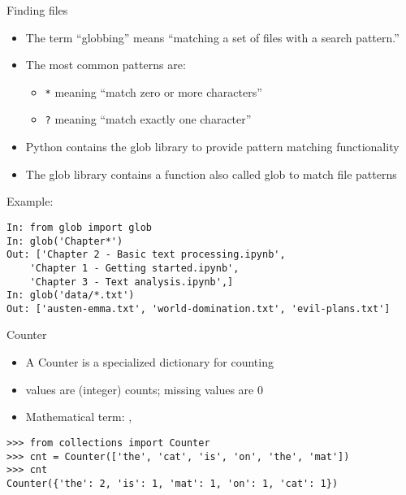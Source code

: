 \documentclass[aspectratio=169,usenames,dvipsnames]{beamer}
\begin{document}
\begin{frame}[fragile]{Finding files}
    \begin{itemize}
        \item The term ``globbing'' means ``matching a set of files with a search pattern.''
        \item The most common patterns are:
            \begin{itemize}
                \item \texttt{*} meaning ``match zero or more characters''
                \item \texttt{?} meaning ``match exactly one character''
            \end{itemize}
        \item Python contains the glob library to provide pattern matching functionality
        \item The glob library contains a function also called glob to match
            file patterns
    \end{itemize}
\pause
Example:
\begin{lstlisting}
In: from glob import glob
In: glob('Chapter*')
Out: ['Chapter 2 - Basic text processing.ipynb',
    'Chapter 1 - Getting started.ipynb',
    'Chapter 3 - Text analysis.ipynb',]
In: glob('data/*.txt')
Out: ['austen-emma.txt', 'world-domination.txt', 'evil-plans.txt']
\end{lstlisting}
\end{frame}

\begin{frame}[fragile]{Counter}
\begin{itemize}
\item A Counter is a specialized dictionary for counting
\item values are (integer) counts; missing values are 0
\item Mathematical term: , 
\end{itemize}

\begin{lstlisting}
>>> from collections import Counter
>>> cnt = Counter(['the', 'cat', 'is', 'on', 'the', 'mat'])
>>> cnt
Counter({'the': 2, 'is': 1, 'mat': 1, 'on': 1, 'cat': 1})
\end{lstlisting}
\end{frame}
\end{document}
